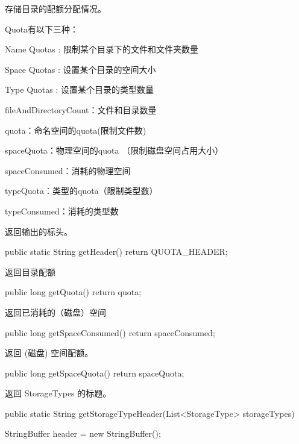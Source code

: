 \begin{java}
存储目录的配额分配情况。

Quota有以下三种：

Name Quotas : 限制某个目录下的文件和文件夹数量

Space Quotas : 设置某个目录的空间大小

Type Quotas : 设置某个目录的类型数量

fileAndDirectoryCount：文件和目录数量

quota：命名空间的quota(限制文件数)

spaceQuota：物理空间的quota （限制磁盘空间占用大小）

spaceConsumed：消耗的物理空间

typeQuota：类型的quota（限制类型数）

typeConsumed：消耗的类型数

返回输出的标头。
\begin{java}
public static String getHeader() {
  return QUOTA_HEADER;
}
\end{java}
返回目录配额
\begin{java}
public long getQuota() {
  return quota;
}
\end{java}
返回已消耗的（磁盘）空间
\begin{java}
public long getSpaceConsumed() {
  return spaceConsumed;
}
\end{java}
返回 (磁盘) 空间配额。
\begin{java}
public long getSpaceQuota() {
  return spaceQuota;
}
\end{java}
返回 StorageTypes 的标题。
\begin{java}
public static String getStorageTypeHeader(List<StorageType> storageTypes) {
  StringBuffer header = new StringBuffer();

}
\end{java}
\end{java}
